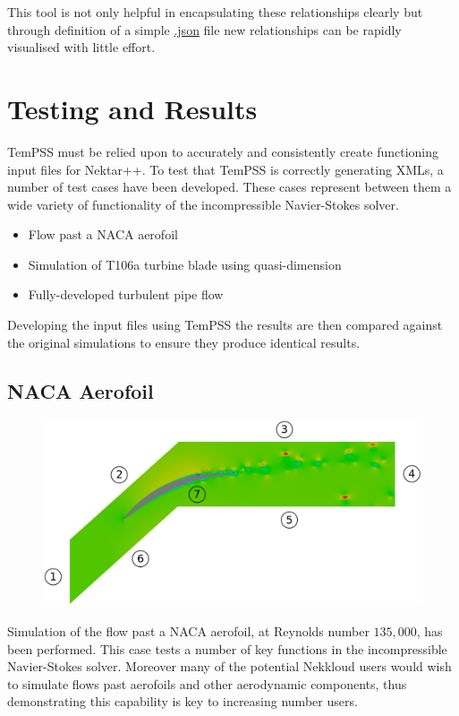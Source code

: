 \documentclass[11pt, a4paper]{report}
\begin{document}
This tool is not only helpful in encapsulating these relationships clearly but through definition of a simple \url{.json} file new relationships can be rapidly visualised with little effort.
\newpage
\chapter{Testing and Results}
TemPSS must be relied upon to accurately and consistently create functioning input files for Nektar++. To test that TemPSS is correctly generating XMLs, a number of test cases have been developed. These cases represent between them a wide variety of functionality of the incompressible Navier-Stokes solver.

\begin{itemize}
\item Flow past a NACA aerofoil
\item Simulation of T106a turbine blade using quasi-dimension
\item Fully-developed turbulent pipe flow
\end{itemize}

Developing the input files using TemPSS the results are then compared against the original simulations to ensure they produce identical results.

\section{NACA Aerofoil}
\begin{figure}[htb!]
 \centering
 \includegraphics[width=.75\linewidth,  clip=true, trim = 0cm 0cm 0cm 0cm]{naca_domain}
 \label{fig:naca_domain}
\end{figure}

Simulation of the flow past a NACA aerofoil, at Reynolds number $135,000$, has been performed. This case tests a number of key functions in the incompressible Navier-Stokes solver. Moreover many of the potential Nekkloud users would wish to simulate flows past aerofoils and other aerodynamic components, thus demonstrating this capability is key to increasing number users.
\end{document}
